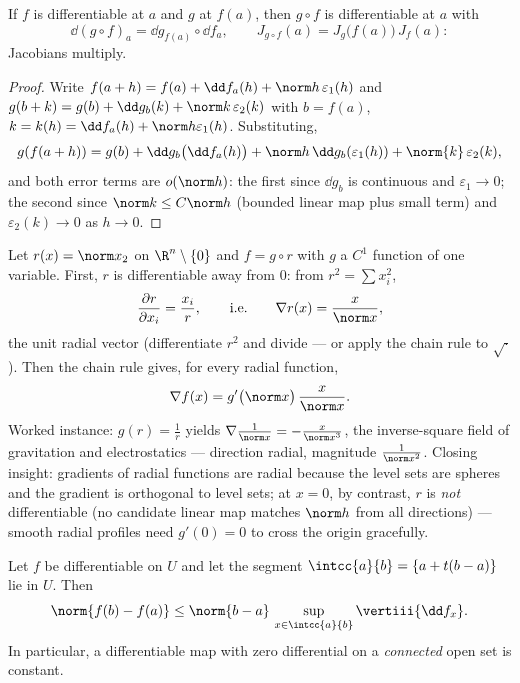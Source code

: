 \begin{theorem}\label{thm:b2:diffcalc:chainrule}
If $f$ is differentiable at $a$ and $g$ at $f(a)$, then $g \circ f$
is differentiable at $a$ with
\[
\dd(g \circ f)_a = \dd g_{f(a)} \circ \dd f_a ,
\qquad
J_{g\circ f}(a) = J_g\bigl(f(a)\bigr)\,J_f(a) :
\]
Jacobians multiply.
\end{theorem}

\begin{proof}
Write $f(a + h) = f(a) + \dd f_a(h) + \norm h\,\varepsilon_1(h)$
and $g(b + k) = g(b) + \dd g_b(k) + \norm k\,\varepsilon_2(k)$ with
$b = f(a)$, $k = k(h) = \dd f_a(h) + \norm h \varepsilon_1(h)$.
Substituting,
\[
g(f(a+h)) = g(b) + \dd g_b\bigl(\dd f_a(h)\bigr)
+ \norm h\,\dd g_b(\varepsilon_1(h)) + \norm{k}\,\varepsilon_2(k),
\]
and both error terms are $o(\norm h)$: the first since $\dd g_b$ is
continuous and $\varepsilon_1 \to 0$; the second since $\norm k
\leq C\norm h$ (bounded linear map plus small term) and
$\varepsilon_2(k) \to 0$ as $h \to 0$.
\end{proof}

\begin{example}\label{ex:b2:diffcalc:radial}
Let $r(x) = \norm x_2$ on $\R^n\setminus\{0\}$ and $f = g \circ
r$ with $g$ a $C^1$ function of one variable. First, $r$ is
differentiable away from $0$: from $r^2 = \sum x_i^2$,
\[
\frac{\partial r}{\partial x_i} = \frac{x_i}{r},
\qquad\text{i.e.}\qquad
\nabla r(x) = \frac{x}{\norm x} ,
\]
the unit radial vector (differentiate $r^2$ and divide --- or
apply the chain rule to $\sqrt{\cdot}$). Then the chain rule
gives, for every radial function,
\[
\nabla f(x) = g'\bigl(\norm x\bigr)\,\frac{x}{\norm x} .
\]
Worked instance: $g(r) = \frac1r$ yields $\nabla\frac{1}{\norm
x} = -\frac{x}{\norm x^3}$, the inverse-square field of
gravitation and electrostatics --- direction radial, magnitude
$\frac{1}{\norm x^2}$. Closing insight: gradients of radial
functions are radial because the level sets are spheres and
the gradient is orthogonal to level sets; at $x = 0$, by
contrast, $r$ is \emph{not} differentiable (no candidate
linear map matches $\norm h$ from all directions) --- smooth
radial profiles need $g'(0) = 0$ to cross the origin
gracefully.
\end{example}

\begin{theorem}\label{thm:b2:diffcalc:mvi}
Let $f$ be differentiable on $U$ and let the segment $\intcc{a}{b}
= \{a + t(b-a)\}$ lie in $U$. Then
\[
\norm{f(b) - f(a)} \leq \norm{b - a}\,
\sup_{x \in \intcc{a}{b}} \vertiii{\dd f_x} .
\]
In particular, a differentiable map with zero differential on a
\emph{connected} open set is constant.
\end{theorem}

